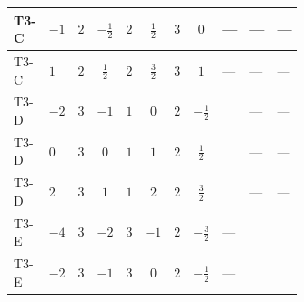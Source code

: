 \documentclass[8pt]{article}
\begin{document}
\begin{landscape}
\begin{longtable}{@{}llcccccc >{\raggedright\arraybackslash}p{0.21\linewidth} >{\raggedright\arraybackslash}p{0.21\linewidth} >{\raggedright\arraybackslash}p{0.21\linewidth}@{}}
\midrule
T3-C & $-1$ & $2$ & $-\frac{1}{2}$ & $2$ & $\frac{1}{2}$ & $3$ & $0$ & --- & --- & --- \\
\midrule
T3-C & $1$ & $2$ & $\frac{1}{2}$ & $2$ & $\frac{3}{2}$ & $3$ & $1$ & --- & --- & --- \\
\midrule
T3-D & $-2$ & $3$ & $-1$ & $1$ & $0$ & $2$ & $-\frac{1}{2}$ & \scriptsize\adjustbox{max width=\linewidth}{$\begin{gathered} {\lambda_{12}^{(1)}} (2 T_{\nu}^{(1)}+4 T_{\nu}^{(2)}+4 {\lambda_{S_1}^{(A)}})\end{gathered}$} & --- & --- \\
\midrule
T3-D & $0$ & $3$ & $0$ & $1$ & $1$ & $2$ & $\frac{1}{2}$ & \scriptsize\adjustbox{max width=\linewidth}{$\begin{gathered} {\lambda_{12}^{(1)}} (2 T_{\nu}^{(1)}+4 T_{\nu}^{(2)}+4 {\lambda_{S_1}^{(A)}})\end{gathered}$} & --- & --- \\
\midrule
T3-D & $2$ & $3$ & $1$ & $1$ & $2$ & $2$ & $\frac{3}{2}$ & \scriptsize\adjustbox{max width=\linewidth}{$\begin{gathered} {\lambda_{12}^{(1)}} (2 T_{\nu}^{(1)}+4 T_{\nu}^{(2)}+4 {\lambda_{S_1}^{(A)}})\end{gathered}$} & --- & --- \\
\midrule
T3-E & $-4$ & $3$ & $-2$ & $3$ & $-1$ & $2$ & $-\frac{3}{2}$ & --- & \scriptsize\adjustbox{max width=\linewidth}{$\begin{gathered} {\lambda_{12}^{(1)}} \left(2 T_{\nu}^{(1)}+2 T_{\nu}^{(2)}+\frac{16 {\lambda_{12}^{(\times)}}}{3}+4 {\lambda_{S_1}^{(A)}}+4 {\lambda_{S_2}^{(A)}}\right)\end{gathered}$} & \scriptsize\adjustbox{max width=\linewidth}{$\begin{gathered} +{\lambda_{12}^{(\times)}} \left(\frac{4}{3} T_{\nu}^{(1)}+\frac{4}{3} T_{\nu}^{(2)}\right)\end{gathered}$} \\
\midrule
T3-E & $-2$ & $3$ & $-1$ & $3$ & $0$ & $2$ & $-\frac{1}{2}$ & --- & \scriptsize\adjustbox{max width=\linewidth}{$\begin{gathered} {\lambda_{12}^{(1)}} \left(2 T_{\nu}^{(1)}+2 T_{\nu}^{(2)}+\frac{16 {\lambda_{12}^{(\times)}}}{3}+4 {\lambda_{S_1}^{(A)}}+4 {\lambda_{S_2}^{(A)}}\right)\end{gathered}$} & \scriptsize\adjustbox{max width=\linewidth}{$\begin{gathered} +{\lambda_{12}^{(\times)}} \left(\frac{4}{3} T_{\nu}^{(1)}+\frac{4}{3} T_{\nu}^{(2)}\right)\end{gathered}$} \\

\end{longtable}
\end{landscape}
\end{document}
